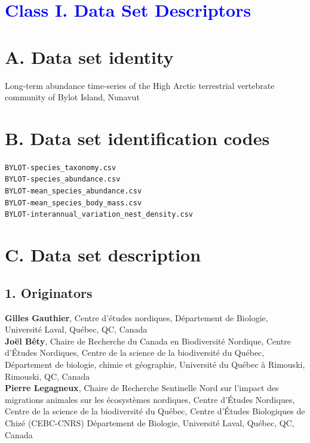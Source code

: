 \documentclass[a4paper,twoside,12pt]{article}
\begin{document}
\section*{\textcolor{Blue}{Class I. Data Set Descriptors}}
    \section*{A. Data set identity} Long-term abundance time-series of the High Arctic terrestrial vertebrate community of Bylot Island, Nunavut
    \section*{B. Data set identification codes}
     \texttt{BYLOT-species\_taxonomy.csv}\\
     \texttt{BYLOT-species\_abundance.csv}\\
     \texttt{BYLOT-mean\_species\_abundance.csv}\\
     \texttt{BYLOT-mean\_species\_body\_mass.csv}\\
     \texttt{BYLOT-interannual\_variation\_nest\_density.csv}\\
     
    \section*{C. Data set description}
		\subsection*{1. Originators}
		\textbf{Gilles Gauthier}, Centre d’études nordiques, Département de Biologie, Université Laval, Québec, QC, Canada\\
  		\textbf{Joël Bêty},  Chaire de Recherche du Canada en Biodiversité Nordique, Centre d’Études Nordiques, Centre de la science de la biodiversité du Québec, Département de biologie, chimie et géographie, Université du Québec à Rimouski, Rimouski, QC, Canada \\
  		\textbf{Pierre Legagneux}, Chaire de Recherche Sentinelle Nord sur l’impact des migrations animales sur les écosystèmes nordiques, Centre d’Études Nordiques, Centre de la science de la biodiversité du Québec, Centre d’Études Biologiques de Chizé (CEBC-CNRS) Département de Biologie, Université Laval, Québec, QC, Canada
  		
\end{document}
